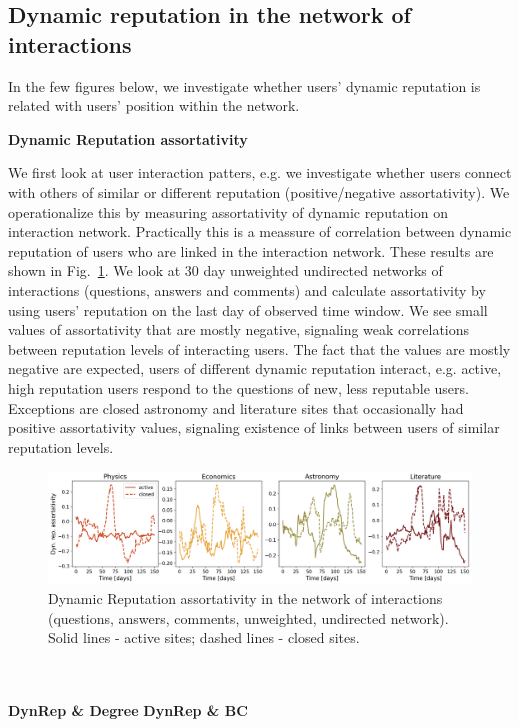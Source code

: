 \subsection{Dynamic reputation in the network of interactions}
In the few figures below, we investigate whether users' dynamic reputation is related with users' position within the network.

\textbf{Dynamic Reputation assortativity}

We first look at user interaction patters, e.g. we investigate whether users connect with others of similar or different reputation (positive/negative assortativity). We operationalize this by measuring assortativity of dynamic reputation on interaction network. Practically this is a meassure of correlation between dynamic reputation of users who are linked in the interaction network. These results are shown in Fig.~\ref{fig:dyn_rep_assort}. We look at 30 day unweighted undirected networks of interactions (questions, answers and comments) and calculate assortativity by using users' reputation on the last day of observed time window. We see small values of assortativity that are mostly negative, signaling weak correlations between reputation levels of interacting users. The fact that the values are mostly negative are expected, users of different dynamic reputation interact, e.g. active, high reputation users respond to the questions of new, less reputable users. Exceptions are closed astronomy and literature sites that occasionally had positive assortativity values, signaling existence of links between users of similar reputation levels.
\begin{figure}[h!]
	\centering
	\includegraphics[width=1\linewidth]{Figures/FigA6.png}
	\caption{Dynamic Reputation assortativity in the network of interactions (questions, answers, comments, unweighted, undirected network). Solid lines - active sites; dashed lines - closed sites.}
	\label{fig:dyn_rep_assort}
\end{figure}
\\~\\
\textbf{DynRep \& Degree}
\textbf{DynRep \& BC}

